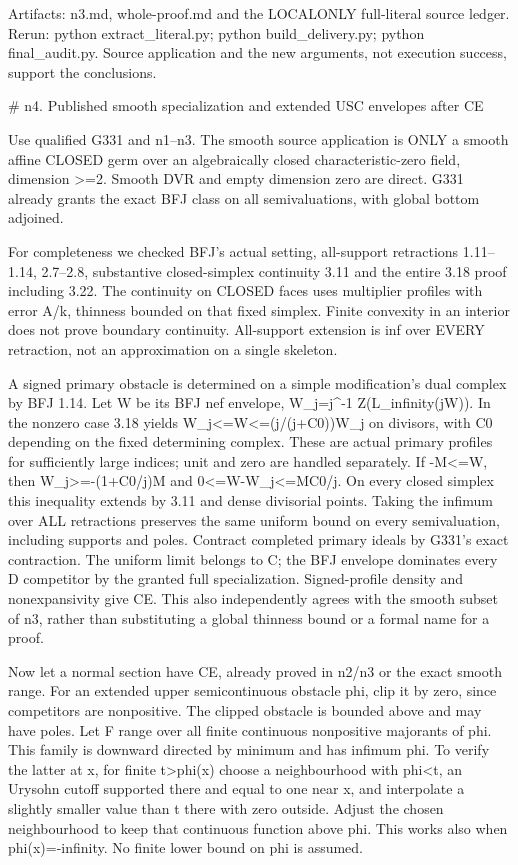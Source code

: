 \documentclass[11pt]{article}
\begin{document}
Artifacts: n3.md, whole-proof.md and the LOCALONLY full-literal source ledger. Rerun: python extract\_literal.py; python build\_delivery.py; python final\_audit.py. Source application and the new arguments, not execution success, support the conclusions.

 \# n4. Published smooth specialization and extended USC envelopes after CE

Use qualified G331 and n1--n3. The smooth source application is ONLY a smooth affine CLOSED germ over an algebraically closed characteristic-zero field, dimension >=2. Smooth DVR and empty dimension zero are direct. G331 already grants the exact BFJ class on all semivaluations, with global bottom adjoined.

For completeness we checked BFJ's actual setting, all-support retractions 1.11--1.14, 2.7--2.8, substantive closed-simplex continuity 3.11 and the entire 3.18 proof including 3.22. The continuity on CLOSED faces uses multiplier profiles with error A/k, thinness bounded on that fixed simplex. Finite convexity in an interior does not prove boundary continuity. All-support extension is inf over EVERY retraction, not an approximation on a single skeleton.

A signed primary obstacle is determined on a simple modification's dual complex by BFJ 1.14. Let W be its BFJ nef envelope, W\_j=j\textasciicircum{}-1 Z(L\_infinity(jW)). In the nonzero case 3.18 yields W\_j<=W<=(j/(j+C0))W\_j on divisors, with C0 depending on the fixed determining complex. These are actual primary profiles for sufficiently large indices; unit and zero are handled separately. If -M<=W, then W\_j>=-(1+C0/j)M and 0<=W-W\_j<=MC0/j. On every closed simplex this inequality extends by 3.11 and dense divisorial points. Taking the infimum over ALL retractions preserves the same uniform bound on every semivaluation, including supports and poles. Contract completed primary ideals by G331's exact contraction. The uniform limit belongs to C; the BFJ envelope dominates every D competitor by the granted full specialization. Signed-profile density and nonexpansivity give CE. This also independently agrees with the smooth subset of n3, rather than substituting a global thinness bound or a formal name for a proof.

Now let a normal section have CE, already proved in n2/n3 or the exact smooth range. For an extended upper semicontinuous obstacle phi, clip it by zero, since competitors are nonpositive. The clipped obstacle is bounded above and may have poles. Let F range over all finite continuous nonpositive majorants of phi. This family is downward directed by minimum and has infimum phi. To verify the latter at x, for finite t>phi(x) choose a neighbourhood with phi<t, an Urysohn cutoff supported there and equal to one near x, and interpolate a slightly smaller value than t there with zero outside. Adjust the chosen neighbourhood to keep that continuous function above phi. This works also when phi(x)=-infinity. No finite lower bound on phi is assumed.
\end{document}
